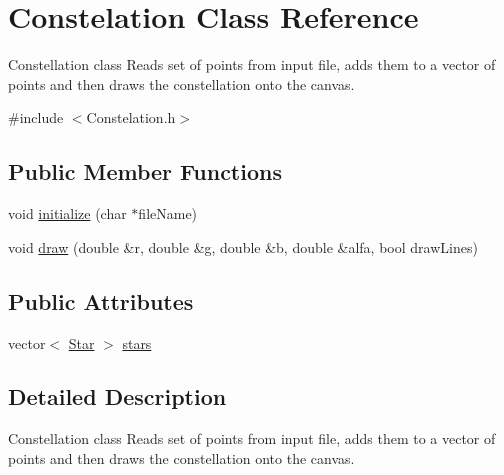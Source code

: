 \hypertarget{classConstelation}{\section{Constelation Class Reference}
\label{classConstelation}
}


Constellation class Reads set of points from input file, adds them to a vector of points and then draws the constellation onto the canvas.  




{\ttfamily \#include $<$Constelation.\-h$>$}

\subsection*{Public Member Functions}
\begin{DoxyCompactItemize}
\item 
void \hyperlink{classConstelation_a67e8f8db581831ce96b9002250547784}{initialize} (char $\ast$file\-Name)
\item 
void \hyperlink{classConstelation_ae35262da5bcbf0123eb568f512aa45e8}{draw} (double \&r, double \&g, double \&b, double \&alfa, bool draw\-Lines)
\end{DoxyCompactItemize}
\subsection*{Public Attributes}
\begin{DoxyCompactItemize}
\item 
vector$<$ \hyperlink{classStar}{Star} $>$ \hyperlink{classConstelation_a71d208ee2a6b57c32f28044ee7acad55}{stars}
\end{DoxyCompactItemize}


\subsection{Detailed Description}
Constellation class Reads set of points from input file, adds them to a vector of points and then draws the constellation onto the canvas. 



